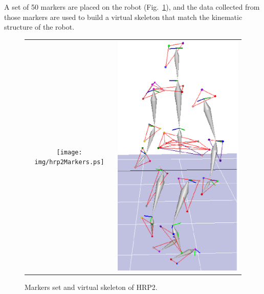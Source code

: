 \documentclass[letterpaper, 10pt, conference]{ieeeconf}      %
\begin{document}
A set of 50 markers
are placed on the robot (Fig.~\ref{fig:hrp2Markers}), and the data collected from those markers
are used to build a virtual skeleton that match the kinematic structure of the robot.
\begin{figure}[t]
  \centering
  \begin{tabular}{cc}
    \texttt{[image: img/hrp2Markers.ps]} &
    \includegraphics[height=0.7\linewidth]{img/skel.ps} \\
  \end{tabular}
  \caption{Markers set and virtual skeleton of HRP2.}
  \label{fig:hrp2Markers}
\end{figure}
\end{document}
